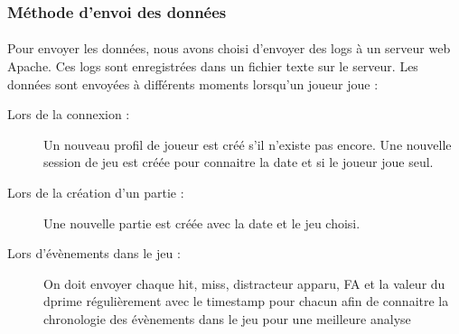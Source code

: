 \subsubsection{Méthode d'envoi des données}

\paragraph{}Pour envoyer les données, nous avons choisi d'envoyer des logs à un serveur web Apache. Ces logs sont enregistrées dans un fichier texte sur le serveur. Les données sont
envoyées à différents moments lorsqu'un joueur joue :
\begin{description}
\item[Lors de la connexion :] Un nouveau profil de joueur est créé s'il n'existe pas encore. Une nouvelle session de jeu est créée pour connaitre la date et si le joueur joue seul.
\item[Lors de la création d'un partie :] Une nouvelle partie est créée avec la date et le jeu choisi.
\item[Lors d'évènements dans le jeu :] On doit envoyer chaque hit, miss, distracteur apparu, FA et la valeur du dprime régulièrement avec le timestamp pour chacun afin de connaitre la
chronologie des évènements dans le jeu pour une meilleure analyse
\end{description}

